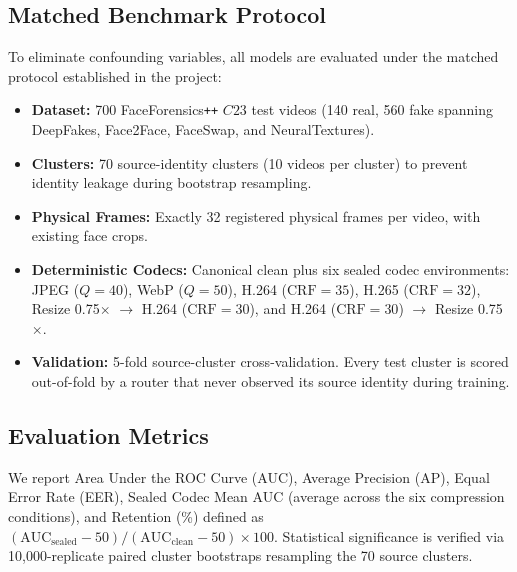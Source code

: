 \documentclass[conference]{IEEEtran}
\newcommand{\ffpp}{FaceForensics\texttt{++}}
\newcommand{\auc}{AUC}
\begin{document}
\subsection{Matched Benchmark Protocol}
To eliminate confounding variables, all models are evaluated under the matched protocol established in the project:
\begin{itemize}
    \item \textbf{Dataset:} 700 \ffpp{} $C23$ test videos (140 real, 560 fake spanning DeepFakes, Face2Face, FaceSwap, and NeuralTextures).
    \item \textbf{Clusters:} 70 source-identity clusters (10 videos per cluster) to prevent identity leakage during bootstrap resampling.
    \item \textbf{Physical Frames:} Exactly 32 registered physical frames per video, with existing face crops.
    \item \textbf{Deterministic Codecs:} Canonical clean plus six sealed codec environments: JPEG ($Q=40$), WebP ($Q=50$), H.264 ($\text{CRF}=35$), H.265 ($\text{CRF}=32$), Resize 0.75$\times$ $\rightarrow$ H.264 ($\text{CRF}=30$), and H.264 ($\text{CRF}=30$) $\rightarrow$ Resize 0.75$\times$.
    \item \textbf{Validation:} 5-fold source-cluster cross-validation. Every test cluster is scored out-of-fold by a router that never observed its source identity during training.
\end{itemize}

\subsection{Evaluation Metrics}
We report Area Under the ROC Curve (\auc{}), Average Precision (AP), Equal Error Rate (EER), Sealed Codec Mean \auc{} (average across the six compression conditions), and Retention (\%) defined as $(\text{AUC}_{\text{sealed}} - 50) / (\text{AUC}_{\text{clean}} - 50) \times 100$. Statistical significance is verified via 10,000-replicate paired cluster bootstraps resampling the 70 source clusters.
\end{document}
